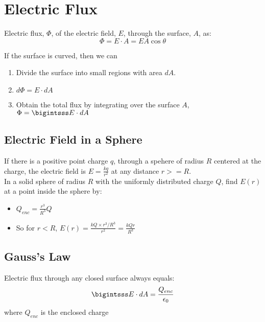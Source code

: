 \documentclass{article}
\begin{document}
\setlength{\parindent}{0pt}

\section*{Electric Flux}
Electric flux, $\Phi$, of the electric field, $E$, through the surface, $A$, as:
\[\Phi=E\cdot A=EA\cos\theta\]

If the surface is curved, then we can
\begin{enumerate}
    \item Divide the surface into small regions with area $dA$.
    \item $d\Phi=E\cdot dA$
    \item Obtain the total flux by integrating over the surface $A$, $\Phi=\bigintsss E\cdot dA$
\end{enumerate}

\subsection*{Electric Field in a Sphere}
If there is a positive point charge $q$, through a spehere of radius $R$ centered at the charge, the electric field is $E=\frac{kq}{r^2}$ at any distance $r >= R$. \\

In a solid sphere of radius $R$ with the uniformly distributed charge $Q$, find $E(r)$ at a point inside the sphere by:
\begin{itemize}
    \item $Q_{enc} = \frac{r^3}{R^3}Q$
    \item So for $r < R$, $E(r)=\frac{kQ \times r^3 / R^3}{r^2}=\frac{kQr}{R^3}$
\end{itemize}

\subsection*{Gauss's Law}
Electric flux through any closed surface always equals:
\[\bigintsss E \cdot dA = \frac{Q_{enc}}{\epsilon_0}\] where $Q_{enc}$ is the enclosed charge

\end{document}
